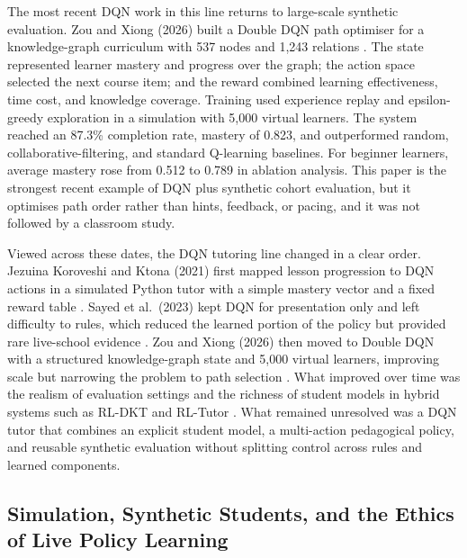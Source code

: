 The most recent DQN work in this line returns to large-scale synthetic evaluation. Zou and Xiong (2026) built a Double DQN path optimiser for a knowledge-graph curriculum with 537 nodes and 1{,}243 relations \cite{zou_deep_2026}. The state represented learner mastery and progress over the graph; the action space selected the next course item; and the reward combined learning effectiveness, time cost, and knowledge coverage. Training used experience replay and epsilon-greedy exploration in a simulation with 5{,}000 virtual learners. The system reached an 87.3\% completion rate, mastery of 0.823, and outperformed random, collaborative-filtering, and standard Q-learning baselines. For beginner learners, average mastery rose from 0.512 to 0.789 in ablation analysis. This paper is the strongest recent example of DQN plus synthetic cohort evaluation, but it optimises path order rather than hints, feedback, or pacing, and it was not followed by a classroom study.

Viewed across these dates, the DQN tutoring line changed in a clear order. Jezuina Koroveshi and Ktona (2021) first mapped lesson progression to DQN actions in a simulated Python tutor with a simple mastery vector and a fixed reward table \cite{jezuina_koroveshi_training_2021}. Sayed et al.\ (2023) kept DQN for presentation only and left difficulty to rules, which reduced the learned portion of the policy but provided rare live-school evidence \cite{sayed_ai-based_2023}. Zou and Xiong (2026) then moved to Double DQN with a structured knowledge-graph state and 5{,}000 virtual learners, improving scale but narrowing the problem to path selection \cite{zou_deep_2026}. What improved over time was the realism of evaluation settings and the richness of student models in hybrid systems such as RL-DKT and RL-Tutor \cite{fu_integrating_2025,guzman_developing_2025}. What remained unresolved was a DQN tutor that combines an explicit student model, a multi-action pedagogical policy, and reusable synthetic evaluation without splitting control across rules and learned components.

\subsection{Simulation, Synthetic Students, and the Ethics of Live Policy Learning}\label{subsec:synthetic_student_evaluation}

